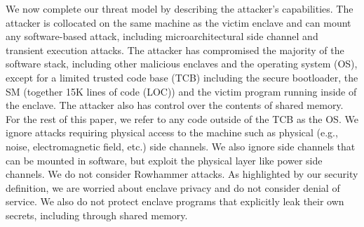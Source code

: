 We now complete our threat model by describing the attacker's capabilities.
The attacker is collocated on the same machine as the victim enclave and can mount any software-based attack, including microarchitectural side channel and transient execution attacks.
The attacker has compromised the majority of the software stack, including other malicious enclaves and the operating system (OS), except for a limited trusted code base (TCB) including the secure bootloader, the SM (together 15K lines of code (LOC)) and the victim program running inside of the enclave.
The attacker also has control over the contents of shared memory.
For the rest of this paper, we refer to any code outside of the TCB as the OS.
We ignore attacks requiring physical access to the machine such as physical (e.g., noise, electromagnetic field, etc.) side channels. 
We also ignore side channels that can be mounted in software, but exploit the physical layer like power side channels.
We do not consider Rowhammer attacks.
As highlighted by our security definition, we are worried about enclave privacy and do not consider denial of service.
We also do not protect enclave programs that explicitly leak their own secrets, including through shared memory.